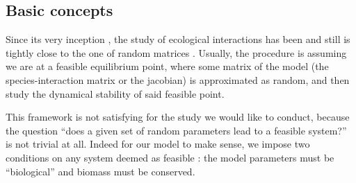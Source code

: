 \documentclass[12pt, titlepage]{report}
\begin{document}
\subsection{Basic concepts}
Since its very inception \cite{may_will_1972}, the study of ecological interactions has been and still is tightly close to the one of random matrices \cite{allesina_stability_2012, allesina_predicting_2015, barbier_cavity_2017}. Usually, the procedure is assuming we are at a feasible equilibrium point, where some matrix of the model (\eg the species-interaction matrix or the jacobian) is approximated as random, and then study the dynamical stability of said feasible point.

This framework is not satisfying for the study we would like to conduct, because the question ``does a given set of random parameters lead to a feasible system?'' is not trivial at all. Indeed for our model to make sense, we impose two conditions on any system deemed as feasible : the model parameters must be ``biological'' and biomass must be conserved.
\end{document}
